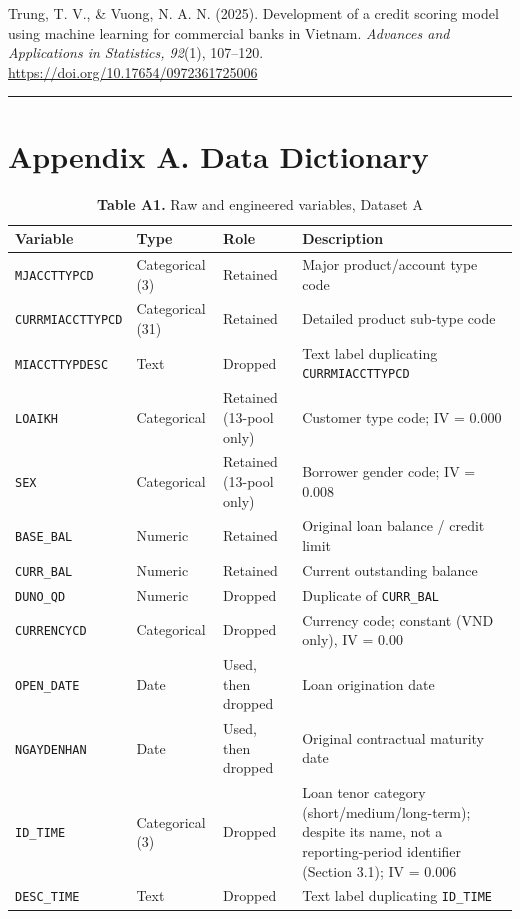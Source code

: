 \documentclass[11pt,a4paper]{article}
\newcommand{\refitem}[1]{\par\noindent\hangindent=1cm\hangafter=1 #1\par\smallskip}
\begin{document}
\refitem{Trung, T. V., \& Vuong, N. A. N. (2025). Development of a credit scoring model using machine learning for commercial banks in Vietnam. \textit{Advances and Applications in Statistics, 92}(1), 107--120. \url{https://doi.org/10.17654/0972361725006}}

\endgroup

\bigskip
\hrule
\bigskip

\section*{Appendix A. Data Dictionary}

\begin{table}[H]
\centering
\caption*{\small\textbf{Table A1.} Raw and engineered variables, Dataset A}
\small
\begin{tabular}{p{2.9cm}p{2.1cm}p{2.3cm}p{6.0cm}}
\toprule
Variable & Type & Role & Description \\
\midrule
\texttt{MJACCTTYPCD} & Categorical (3) & Retained & Major product/account type code \\
\texttt{CURRMIACCTTYPCD} & Categorical (31) & Retained & Detailed product sub-type code \\
\texttt{MIACCTTYPDESC} & Text & Dropped & Text label duplicating \texttt{CURRMIACCTTYPCD} \\
\texttt{LOAIKH} & Categorical & Retained (13-pool only) & Customer type code; IV = 0.000 \\
\texttt{SEX} & Categorical & Retained (13-pool only) & Borrower gender code; IV = 0.008 \\
\texttt{BASE\_BAL} & Numeric & Retained & Original loan balance / credit limit \\
\texttt{CURR\_BAL} & Numeric & Retained & Current outstanding balance \\
\texttt{DUNO\_QD} & Numeric & Dropped & Duplicate of \texttt{CURR\_BAL} \\
\texttt{CURRENCYCD} & Categorical & Dropped & Currency code; constant (VND only), IV = 0.00 \\
\texttt{OPEN\_DATE} & Date & Used, then dropped & Loan origination date \\
\texttt{NGAYDENHAN} & Date & Used, then dropped & Original contractual maturity date \\
\texttt{ID\_TIME} & Categorical (3) & Dropped & Loan tenor category (short/medium/long-term); despite its name, not a reporting-period identifier (Section 3.1); IV = 0.006 \\
\texttt{DESC\_TIME} & Text & Dropped & Text label duplicating \texttt{ID\_TIME} \\

\end{tabular}
\end{table}
\end{document}
